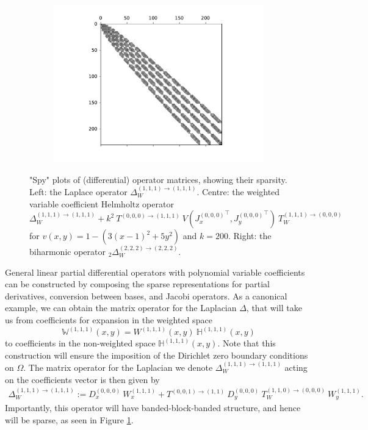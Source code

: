 \documentclass[11pt, oneside]{article}   	%
\newcommand{\hdop}{H}
\newcommand{\Wiii}{W^{(1,1,1)}}
\newcommand{\bighdopiii}{{\mathbb{\hdop}^{(1,1,1)}}}
\newcommand{\laplacewiii}{\Delta_W^{(1,1,1)\to(1,1,1)}}
\newcommand{\biharmonictwo}{_2\Delta_W^{(2,2,2)\to(2,2,2)}}
\newcommand{\bigWiii}{{\mathbb{W}^{(1,1,1)}}}
\begin{document}
\begin{figure}[t]
\begin{subfigure}{0.32\textwidth}
	\includegraphics[scale=0.35]{sparsityofbiharmonic} %
        \centering
	\end{subfigure}
    	\caption{"Spy" plots of (differential) operator matrices, showing their sparsity. Left: the Laplace operator $\laplacewiii$. Centre: the weighted variable coefficient Helmholtz operator $\laplacewiii + k^2 \: T^{(0,0,0)\to(1,1,1)} \: V({J_x^{(0,0,0)}}^\top, {J_y^{(0,0,0)}}^\top) \: T_W^{(1,1,1)\to(0,0,0)}$ for $v(x,y) = 1 - (3(x-1)^2 + 5y^2)$ and $k = 200$. Right: the biharmonic operator $\biharmonictwo$.}
        \label{fig:sparsity}
        \centering
\end{figure}

General linear partial differential operators with polynomial variable coefficients can be constructed by composing the sparse representations for partial derivatives, conversion between bases, and Jacobi operators. As a canonical example, we can obtain the matrix operator for the Laplacian \(\Delta\), that will take us from coefficients for expansion in the weighted space
$$
\bigWiii(x,y) = \Wiii(x,y) \: \bighdopiii(x,y)
$$
to coefficients in the non-weighted space $\bighdopiii(x,y)$. Note that this construction will ensure the imposition of the Dirichlet zero boundary conditions on $\Omega$. The matrix operator for the Laplacian we denote $\laplacewiii$ acting on the coefficients vector is then given by
\begin{align*}
    \laplacewiii := D_x^{(0,0,0)} \: W_x^{(1,1,1)} + T^{(0,0,1)\to(1,1)} \: D_y^{(0,0,0)} \: T_W^{(1,1,0)\to(0,0,0)} \: W_y^{(1,1,1)}.
\end{align*}
Importantly, this operator will have banded-block-banded structure, and hence will be sparse, as seen in Figure \ref{fig:sparsity}.
\end{document}
